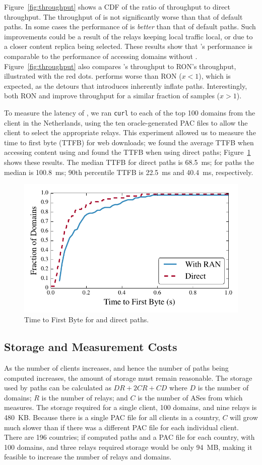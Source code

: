 Figure~\ref{fig:throughput} shows a CDF of the ratio of \system{}
throughput to direct throughput.  The throughput of
\system{} is not significantly worse than that of default paths.  
In some cases the performance of \system{} is {\it better} than
that of default paths.  Such improvements could be a result of the
relays keeping local traffic local, or due to a closer content replica
being selected.  These results show that \system{}'s performance is
comparable to the performance of accessing domains without \system{}.
Figure~\ref{fig:throughput} also compares \system{}'s throughput to
RON's throughput, illustrated with the red dots.  \system{} performs
worse than RON ($x < 1$), which is expected, as the detours that
\system{} introduces inherently inflate paths.  Interestingly, both
RON and \system{} improve throughput for a similar fraction of samples
($x>1$).

To measure the latency of \system{}, we ran {\tt curl} to each of the  top 100
domains from the client in the Netherlands, using the ten oracle-generated PAC
files to allow the client to select the appropriate relays. This experiment
allowed us to measure the time to first byte (TTFB) for web downloads; we
found the average TTFB when accessing content using \system{} and  found the
TTFB when using direct paths; 
Figure~\ref{fig:latency} shows these results. The median TTFB for direct paths is
68.5~ms; for
\system{} paths the median is 100.8~ms; 90th percentile TTFB is 22.5~ms and
40.4~ms, respectively.


\begin{figure}[t]
\centering
\includegraphics[width=.5\textwidth]{latency}
\caption{Time to First Byte for \system{} and direct paths.}
\label{fig:latency}
\end{figure}


\subsection{Storage and Measurement Costs}

As the number of clients increases, and hence the number of paths being 
computed increases, the amount of storage must remain reasonable.  The storage 
used by paths can be calculated as
$DR + 2CR + CD$
where $D$ is the number of domains; $R$ is the number of relays; and $C$ is the
number of ASes from which \system{} measures.
The storage required for a single client, 100 domains, and nine relays is
480~KB.  Because there is a single PAC file for all clients in 
a country, $C$ will grow much slower than if there was a different PAC file for 
each individual client.  There are 196 countries; if \system{} computed
paths and a PAC file for each country, with 100 domains, and 
three relays required storage would be only 94~MB, making it
feasible to increase the number of relays and domains.

